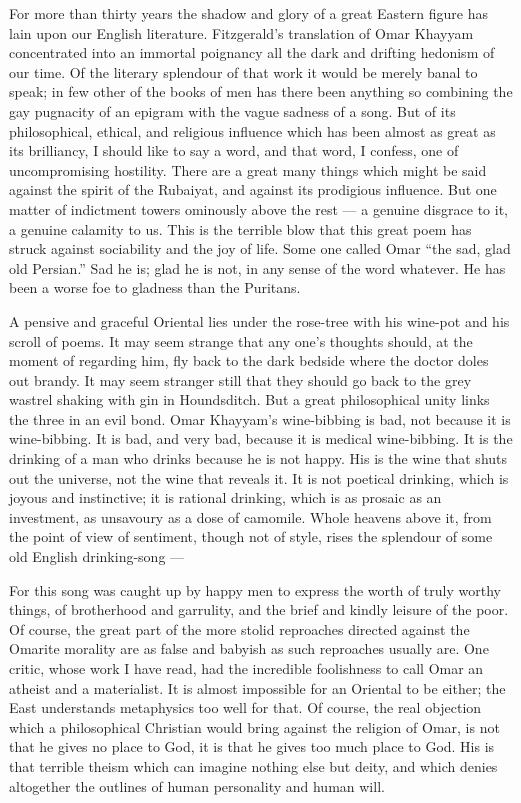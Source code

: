 For more than thirty years the shadow and glory of a great Eastern figure has lain upon our English literature. Fitzgerald’s translation of Omar Khayyam concentrated into an immortal poignancy all the dark and drifting hedonism of our time. Of the literary splendour of that work it would be merely banal to speak; in few other of the books of men has there been anything so combining the gay pugnacity of an epigram with the vague sadness of a song. But of its philosophical, ethical, and religious influence which has been almost as great as its brilliancy, I should like to say a word, and that word, I confess, one of uncompromising hostility. There are a great many things which might be said against the spirit of the Rubaiyat, and against its prodigious influence. But one matter of indictment towers ominously above the rest — a genuine disgrace to it, a genuine calamity to us. This is the terrible blow that this great poem has struck against sociability and the joy of life. Some one called Omar “the sad, glad old Persian.” Sad he is; glad he is not, in any sense of the word whatever. He has been a worse foe to gladness than the Puritans.

A pensive and graceful Oriental lies under the rose-tree with his wine-pot and his scroll of poems. It may seem strange that any one’s thoughts should, at the moment of regarding him, fly back to the dark bedside where the doctor doles out brandy. It may seem stranger still that they should go back to the grey wastrel shaking with gin in Houndsditch. But a great philosophical unity links the three in an evil bond. Omar Khayyam’s wine-bibbing is bad, not because it is wine-bibbing. It is bad, and very bad, because it is medical wine-bibbing. It is the drinking of a man who drinks because he is not happy. His is the wine that shuts out the universe, not the wine that reveals it. It is not poetical drinking, which is joyous and instinctive; it is rational drinking, which is as prosaic as an investment, as unsavoury as a dose of camomile. Whole heavens above it, from the point of view of sentiment, though not of style, rises the splendour of some old English drinking-song —

For this song was caught up by happy men to express the worth of truly worthy things, of brotherhood and garrulity, and the brief and kindly leisure of the poor. Of course, the great part of the more stolid reproaches directed against the Omarite morality are as false and babyish as such reproaches usually are. One critic, whose work I have read, had the incredible foolishness to call Omar an atheist and a materialist. It is almost impossible for an Oriental to be either; the East understands metaphysics too well for that. Of course, the real objection which a philosophical Christian would bring against the religion of Omar, is not that he gives no place to God, it is that he gives too much place to God. His is that terrible theism which can imagine nothing else but deity, and which denies altogether the outlines of human personality and human will.

